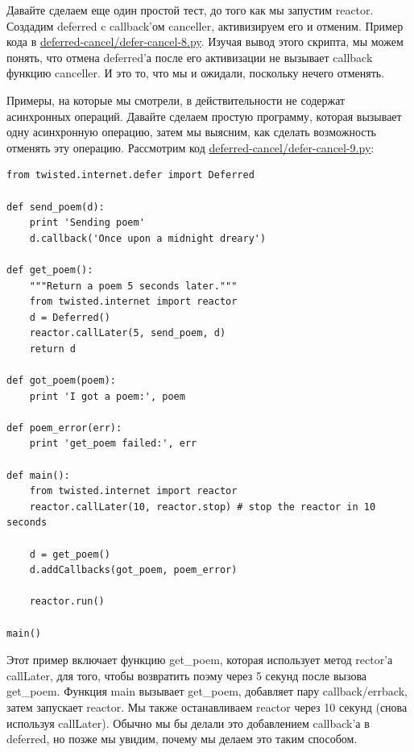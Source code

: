 Давайте сделаем еще один простой тест, до того как 
мы запустим reactor. Создадим deferred c callback'ом 
canceller, активизируем его и отменим. Пример кода в 
\href{http://github.com/jdavisp3/twisted-intro/blob/master/deferred-cancel/defer-cancel-8.py#L1}{deferred-cancel/defer-cancel-8.py}. Изучая вывод этого скрипта, мы можем 
понять, что отмена deferred'а после его активизации не 
вызывает callback функцию canceller. И это то, что мы и ожидали, 
поскольку нечего отменять.


Примеры, на которые мы смотрели, в действительности 
не содержат асинхронных операций. Давайте сделаем 
простую программу, которая вызывает одну асинхронную 
операцию, затем мы выясним, как сделать возможность 
отменять эту операцию. Рассмотрим код 
\href{http://github.com/jdavisp3/twisted-intro/blob/master/deferred-cancel/defer-cancel-9.py#L1}{deferred-cancel/defer-cancel-9.py}:

\begin{scriptsize}\begin{verbatim}
from twisted.internet.defer import Deferred

def send_poem(d):
    print 'Sending poem'
    d.callback('Once upon a midnight dreary')

def get_poem():
    """Return a poem 5 seconds later."""
    from twisted.internet import reactor
    d = Deferred()
    reactor.callLater(5, send_poem, d)
    return d

def got_poem(poem):
    print 'I got a poem:', poem

def poem_error(err):
    print 'get_poem failed:', err

def main():
    from twisted.internet import reactor
    reactor.callLater(10, reactor.stop) # stop the reactor in 10 seconds

    d = get_poem()
    d.addCallbacks(got_poem, poem_error)

    reactor.run()

main()
\end{verbatim}\end{scriptsize}


Этот пример включает функцию get\_poem, которая использует метод 
rector'а callLater, для того, чтобы возвратить поэму через 5 секунд 
после вызова get\_poem. Функция main вызывает get\_poem, добавляет 
пару callback/errback, затем запускает reactor. Мы также останавливаем 
reactor через 10 секунд (снова используя callLater). Обычно мы бы 
делали это добавлением callback'а в deferred, но позже мы увидим, 
почему мы делаем это таким способом.



